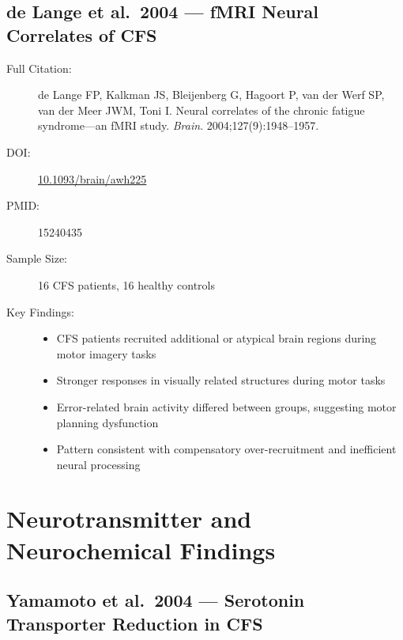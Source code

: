 \subsection{de Lange et al.\ 2004 --- fMRI Neural Correlates of CFS}

\begin{description}
    \item[Full Citation:] de Lange FP, Kalkman JS, Bleijenberg G, Hagoort P, van der Werf SP, van der Meer JWM, Toni I\@. Neural correlates of the chronic fatigue syndrome---an fMRI study. \textit{Brain}. 2004;127(9):1948--1957.
    \item[DOI:] \href{https://doi.org/10.1093/brain/awh225}{10.1093/brain/awh225}
    \item[PMID:] 15240435
    \item[Sample Size:] 16 CFS patients, 16 healthy controls
    \item[Key Findings:]
    \begin{itemize}
        \item CFS patients recruited additional or atypical brain regions during motor imagery tasks
        \item Stronger responses in visually related structures during motor tasks
        \item Error-related brain activity differed between groups, suggesting motor planning dysfunction
        \item Pattern consistent with compensatory over-recruitment and inefficient neural processing
    \end{itemize}
\end{description}

\section{Neurotransmitter and Neurochemical Findings}
\label{sec:bib-neurotransmitters}

\subsection{Yamamoto et al.\ 2004 --- Serotonin Transporter Reduction in CFS}


